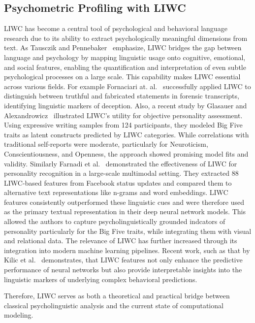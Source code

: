 
\subsection{Psychometric Profiling with LIWC}

LIWC has become a central tool of psychological and behavioral language research due to its ability to extract psychologically meaningful dimensions from text. As Tausczik and Pennebaker~\cite{tausczik2010psychological} emphasize, LIWC bridges the gap between language and psychology by mapping linguistic usage onto cognitive, emotional, and social features, enabling the quantification and interpretation of even subtle psychological processes on a large scale. This capability makes LIWC essential across various fields. For example Fornaciari at. al.~\cite{fornaciari2013automatic} successfully applied LIWC to distinguish between truthful and fabricated statements in forensic transcripts, identifying linguistic markers of deception. Also, a recent study by Glasauer and Alexandrowicz~\cite{glasauer2022bigfive} illustrated LIWC’s utility for objective personality assessment. Using expressive writing samples from 124 participants, they modeled Big Five traits as latent constructs predicted by LIWC categories. While correlations with traditional self-reports were moderate, particularly for Neuroticism, Conscientiousness, and Openness, the approach showed promising model fits and validity. Similarly Farnadi et al.~\cite{farnadi2018user} demonstrated the effectiveness of LIWC for personality recognition in a large-scale multimodal setting. They extracted 88 LIWC-based features from Facebook status updates and compared them to alternative text representations like n-grams and word embeddings. LIWC features consistently outperformed these linguistic cues and were therefore used as the primary textual representation in their deep neural network models. This allowed the authors to capture psycholinguistically grounded indcators of personality particularly for the Big Five traits, while integrating them with visual and relational data. The relevance of LIWC has further increased through its integration into modern machine learning pipelines. Recent work, such as that by Kilic et al.~\cite{yakut-kilic-pan-2022-incorporating} demonstrates, that LIWC  features not only enhance the predictive performance of neural networks but also provide interpretable insights into the linguistic markers of underlying complex behavioral predictions.

Therefore, LIWC serves as both a theoretical and practical bridge between classical psycholinguistic analysis and the current state of computational modeling. 

